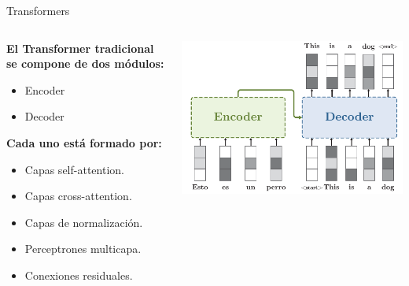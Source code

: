 \documentclass[aspectratio=169]{beamer}
\begin{document}
\begin{frame}{Transformers}
  \begin{columns}
    \begin{column}{.4\textwidth}
      \textbf{El Transformer tradicional se compone de dos módulos:}
      \begin{itemize}
        \item Encoder
        \item Decoder
      \end{itemize}
      \vspace{.5cm}
      \textbf{Cada uno está formado por:}
      \begin{itemize}
        \item Capas self-attention.
        \item Capas cross-attention.
        \item Capas de normalización.
        \item Perceptrones multicapa.
        \item Conexiones residuales.
      \end{itemize}
    \end{column}
    \begin{column}{.6\textwidth}
      \includegraphics[width=\textwidth, center]{imgs/tema4/att/Transformer_all.pdf}
    \end{column}
  \end{columns}
\end{frame}
\end{document}
